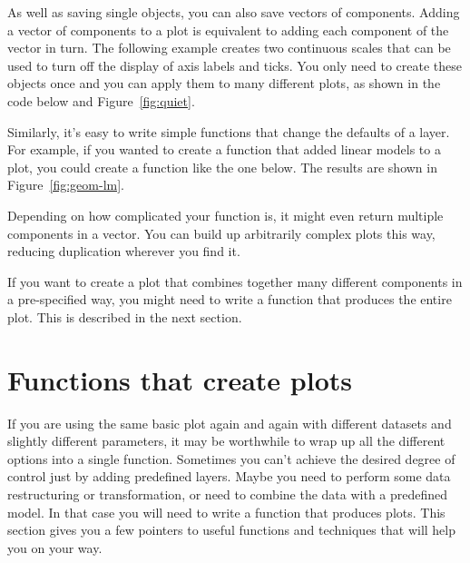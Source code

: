 As well as saving single objects, you can also save vectors of \ggplot components.  Adding a vector of components to a plot is equivalent to adding each component of the vector in turn.  The following example creates two continuous scales that can be used to turn off the display of axis labels and ticks.  You only need to create these objects once and you can apply them to many different plots, as shown in the code below and Figure~\ref{fig:quiet}.

% 
% 


Similarly, it's easy to write simple functions that change the defaults of a layer. For example, if you wanted to create a function that added linear models to a plot, you could create a function like the one below.  The results are shown in Figure~\ref{fig:geom-lm}.  

Depending on how complicated your function is, it might even return multiple components in a vector. You can build up arbitrarily complex plots this way, reducing duplication wherever you find it.

% 


If you want to create a plot that combines together many different components in a pre-specified way, you might need to write a function that produces the entire plot.  This is described in the next section.

\section{Functions that create plots}
\label{sec:functions}

If you are using the same basic plot again and again with different datasets and slightly different parameters, it may be worthwhile to wrap up all the different options into a single function. Sometimes you can't achieve the desired degree of control just by adding predefined layers. Maybe you need to perform some data restructuring or transformation, or need to combine the data with a predefined model. In that case you will need to write a function that produces \ggplot plots. This section gives you a few pointers to useful functions and techniques that will help you on your way. 

